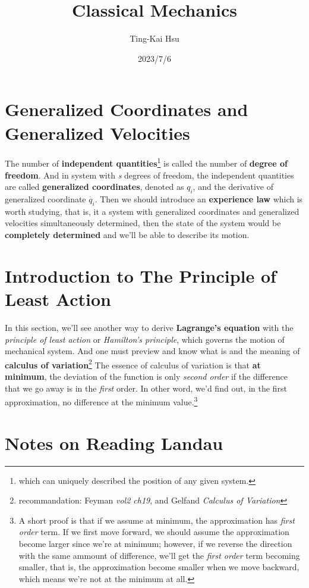 \documentclass[12pt]{article}
\title{Classical Mechanics}
\author{Ting-Kai Hsu}
\date{2023/7/6}
\numberwithin{equation}{section}
\begin{document}
\maketitle
\tableofcontents
\section{Generalized Coordinates and Generalized Velocities}
The number of \textbf{independent quantities}\footnote{which can uniquely described the position of any given system.} is called the number of \textbf{degree of freedom}. And in system with \textit{s} degrees of freedom, the independent quantities are called \textbf{generalized coordinates}, denoted as $q_i$, and the derivative of generalized coordinate $\dot{q_i}$. Then we should introduce an \textbf{experience law} which is worth studying, that is, it a system with generalized coordinates and generalized velocities simultaneously determined, then the state of the system would be \textbf{completely determined} and we'll be able to describe its motion.

\section{Introduction to The Principle of Least Action}
In this section, we'll see another way to derive \textbf{Lagrange's equation} with the \textit{principle of least action} or \textit{Hamilton's principle}, which governs the motion of mechanical system.
And one must preview and know what is and the meaning of \textbf{calculus of variation}\footnote{recommandation: Feyman \textit{vol2 ch19}, and Gelfand \textit{Calculus of Variation}}
The essence of calculus of variation is that \textbf{at minimum}, the deviation of the function is only \textit{second order} if the difference that we go away is in the \textit{first} order. In other word, we'd find out, in the first approximation, no difference at the minimum value.\footnote{A short proof is that if we assume at minimum, the approximation has \textit{first order} term. If we first move forward, we should assume the approximation become larger since we're at minimum; however, if we reverse the direction with the same ammount of difference, we'll get the \textit{first order} term becoming smaller, that is, the approximation become smaller when we move backward, which means we're not at the minimum at all.}

\section{Notes on Reading Landau}
\end{document}

